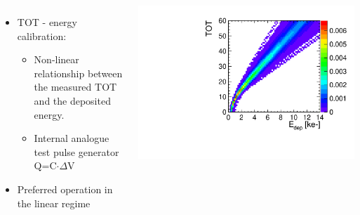 \begin{frame}
  \begin{columns}
    \begin{itemize}
    \item TOT - energy calibration:
      \begin{itemize}
      \item Non-linear relationship between the measured TOT and the
        deposited energy.
      \item Internal analogue test pulse generator \\
        Q=C$\cdot \Delta$V
      \end{itemize}
    \item Preferred operation in the linear regime
    \end{itemize}



    \centering
    \includegraphics[width=\textwidth]{../figures/Calibration/TOTcalibration_W0005_E02_thresh1160.pdf}
  \end{columns}

\end{frame}

